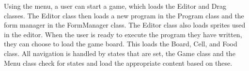 Using the menu, a user can start a game, which loads the Editor and Drag classes. The Editor class then loads a new program in the Program class and the form manager in the FormManager class. The Editor class also loads sprites used in the editor. When the user is ready to execute the program they have written, they can choose to load the game board. This loads the Board, Cell, and Food class. All navigation is handled by states that are set, the Game class and the Menu class check for states and load the appropriate content based on these.